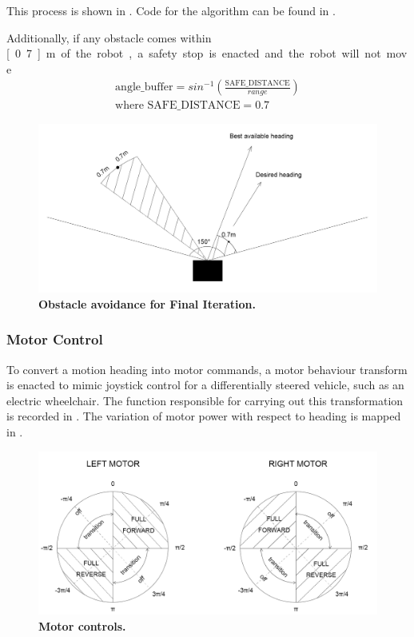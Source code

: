 \documentclass[titlepage,12pt,a4paper]{article}
\begin{document}
This process is shown in . Code for the algorithm can be found in .

Additionally, if any obstacle comes within \unit[0.7]{m} of the robot, a safety stop is enacted and the robot will not move.

\begin{equation}
\begin{split}
	\text{angle\_buffer} = sin^{-1}(\frac{\text{SAFE\_DISTANCE}}{range})\\
	\text{where } \text{SAFE\_DISTANCE} = 0.7
\end{split}
	\label{equation:bearing_buffer}
\end{equation}

\begin{figure}[h]
	\centering
	\includegraphics[scale=0.25]{figures/finalObstacle.png}
	\caption{\textbf{Obstacle avoidance for Final Iteration.}}
	\label{figure:obstacle_avoidance_final}
\end{figure}

\subsubsection{Motor Control}

To convert a motion heading into motor commands, a motor behaviour transform is enacted to mimic joystick control for a differentially steered vehicle, such as an electric wheelchair. The function responsible for carrying out this transformation is recorded in . The variation of motor power with respect to heading is mapped in .

\begin{figure}[h]
	\centering
	\includegraphics[scale=0.25]{figures/motors.png}
	\caption{\textbf{Motor controls.}}
	\label{figure:motor_control}
\end{figure}
\end{document}
